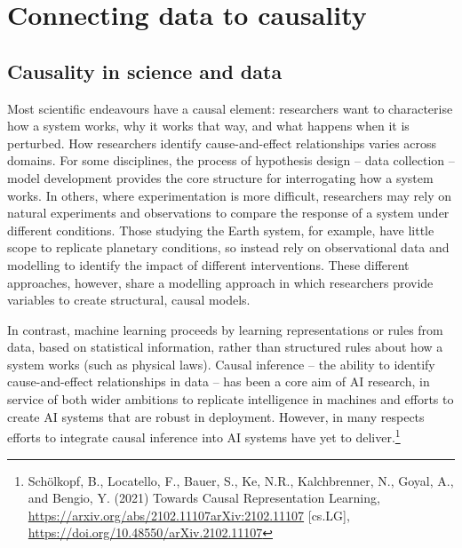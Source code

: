 \section{Connecting data to causality}\label{connecting-data-to-causality}

\subsection{Causality in science and data}\label{causality-in-science-and-data}

Most scientific endeavours have a causal element: researchers want to
characterise how a system works, why it works that way, and what happens
when it is perturbed. How researchers identify cause-and-effect
relationships varies across domains. For some disciplines, the process
of hypothesis design -- data collection -- model development provides
the core structure for interrogating how a system works. In others,
where experimentation is more difficult, researchers may rely on natural
experiments and observations to compare the response of a system under
different conditions. Those studying the Earth system, for example, have
little scope to replicate planetary conditions, so instead rely on
observational data and modelling to identify the impact of different
interventions. These different approaches, however, share a modelling
approach in which researchers provide variables to create structural,
causal models.

In contrast, machine learning proceeds by learning representations or
rules from data, based on statistical information, rather than
structured rules about how a system works (such as physical laws).
Causal inference -- the ability to identify cause-and-effect
relationships in data -- has been a core aim of AI research, in service
of both wider ambitions to replicate intelligence in machines and
efforts to create AI systems that are robust in deployment. However, in
many respects efforts to integrate causal inference into AI systems have
yet to deliver.\footnote{Schölkopf, B., Locatello, F., Bauer, S., Ke,
  N.R., Kalchbrenner, N., Goyal, A., and Bengio, Y. (2021) Towards
  Causal Representation Learning,
  \url{https://arxiv.org/abs/2102.11107}{\uline{arXiv:2102.11107}}
  {[}cs.LG{]},
  \url{https://doi.org/10.48550/arXiv.2102.11107}}


